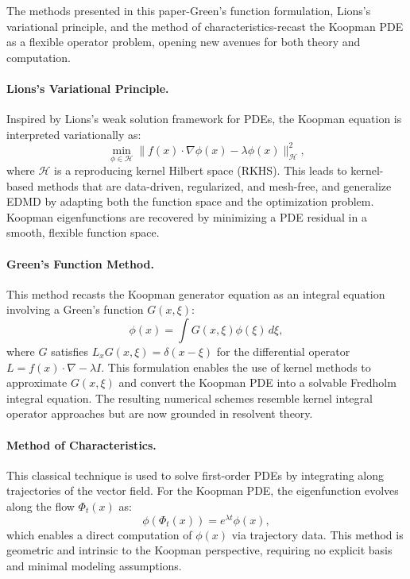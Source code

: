 \documentclass[11pt]{article}
\theoremstyle{plain}
\def\[{\begin{equation}}
\def\]{\end{equation}}
\begin{document}
The methods presented in this paper-Green's function formulation, Lions's variational principle, and the method of characteristics-recast the Koopman PDE as a flexible operator problem, opening new avenues for both theory and computation.
 

\paragraph{Lions’s Variational Principle.}
Inspired by Lions's weak solution framework for PDEs, the Koopman equation is interpreted variationally as:
\[
\min_{\phi \in \mathcal{H}} \|f(x) \cdot \nabla \phi(x) - \lambda \phi(x)\|^2_{\mathcal{H}},
\]
where $\mathcal{H}$ is a reproducing kernel Hilbert space (RKHS). This leads to kernel-based methods that are data-driven, regularized, and mesh-free, and generalize EDMD by adapting both the function space and the optimization problem. Koopman eigenfunctions are recovered by minimizing a PDE residual in a smooth, flexible function space.


\paragraph{Green's Function Method.}
This method recasts the Koopman generator equation as an integral equation involving a Green’s function $G(x, \xi)$:
\[
\phi(x) = \int G(x, \xi) \phi(\xi) \, d\xi,
\]
where $G$ satisfies $L_x G(x, \xi) = \delta(x - \xi)$ for the differential operator $L = f(x) \cdot \nabla - \lambda I$. This formulation enables the use of kernel methods to approximate $G(x, \xi)$ and convert the Koopman PDE into a solvable Fredholm integral equation. The resulting numerical schemes resemble kernel integral operator approaches but are now grounded in resolvent theory.


\paragraph{Method of Characteristics.}
This classical technique is used to solve first-order PDEs by integrating along trajectories of the vector field. For the Koopman PDE, the eigenfunction evolves along the flow $\Phi_t(x)$ as:
\[
\phi(\Phi_t(x)) = e^{\lambda t} \phi(x),
\]
which enables a direct computation of $\phi(x)$ via trajectory data. This method is geometric and intrinsic to the Koopman perspective, requiring no explicit basis and minimal modeling assumptions.
\end{document}
